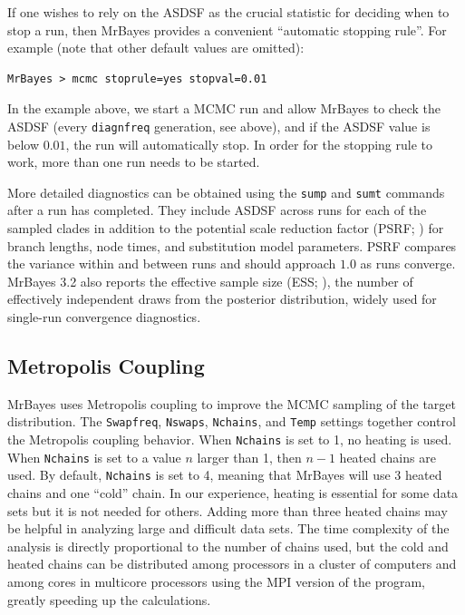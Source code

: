 \documentclass[12pt]{book}
\newcommand{\ttt}[1]{\texttt{#1}}
\begin{document}
If one wishes to rely on the ASDSF as the crucial statistic for deciding when to stop a run, then
MrBayes provides a convenient ``automatic stopping rule''. For example (note that other default
values are omitted):

\small
\begin{singlespacing}
\begin{verbatim}
MrBayes > mcmc stoprule=yes stopval=0.01
\end{verbatim}
\end{singlespacing}
\normalsize

In the example above, we start a MCMC run and allow MrBayes to check the ASDSF (every
\ttt{diagnfreq} generation, see above), and if the ASDSF value is below $0.01$, the run will
automatically stop. In order for the stopping rule to work, more than one run needs to be started.

More detailed diagnostics can be obtained using the \ttt{sump} and \ttt{sumt} commands after a run
has completed. They include ASDSF across runs for each of the sampled clades in addition to the
potential scale reduction factor (PSRF; \citep{gelman92}) for branch lengths, node times, and
substitution model parameters. PSRF compares the variance within and between runs and should
approach $1.0$ as runs converge. MrBayes 3.2 also reports the effective sample size (ESS;
\citep{ripley87}), the number of effectively independent draws from the posterior distribution,
widely used for single-run convergence diagnostics.


\subsection{Metropolis Coupling}
\label{metropolisCoupling}

MrBayes uses Metropolis coupling to improve the MCMC sampling of the target distribution. The
\ttt{Swapfreq}, \ttt{Nswaps}, \ttt{Nchains}, and \ttt{Temp} settings together control the
Metropolis coupling behavior. When \ttt{Nchains} is set to 1, no heating is used. When
\ttt{Nchains} is set to a value $n$ larger than 1, then $n - 1$ heated chains are used. By default,
\ttt{Nchains} is set to 4, meaning that MrBayes will use 3 heated chains and one ``cold'' chain. In
our experience, heating is essential for some data sets but it is not needed for others. Adding
more than three heated chains may be helpful in analyzing large and difficult data sets. The time
complexity of the analysis is directly proportional to the number of chains used, but the cold and
heated chains can be distributed among processors in a cluster of computers and among cores in
multicore processors using the MPI version of the program, greatly speeding up the calculations.
\end{document}
